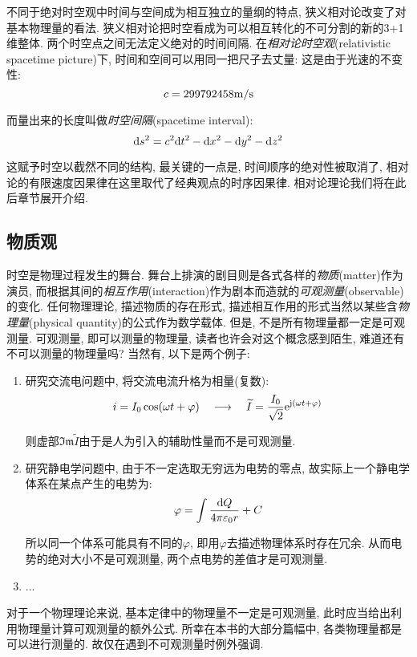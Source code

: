 不同于绝对时空观中时间与空间成为相互独立的量纲的特点, 狭义相对论改变了对基本物理量的看法. 狭义相对论把时空看成为可以相互转化的不可分割的新的3+1维整体. 两个时空点之间无法定义绝对的时间间隔. 在\emph{相对论时空观}(relativistic spacetime picture)下, 时间和空间可以用同一把尺子去丈量: 这是由于光速的不变性:
\[c=299792458{\rm m/s}\]

而量出来的长度叫做\emph{时空间隔}(spacetime interval):
\[\textrm{d} s^2=c^2\textrm{d} t^2-\textrm{d} x^2-\textrm{d} y^2-\textrm{d} z^2\]

这赋予时空以截然不同的结构, 最关键的一点是, 时间顺序的绝对性被取消了, 相对论的有限速度因果律在这里取代了经典观点的时序因果律. 相对论理论我们将在此后章节展开介绍.

\subsection{物质观}\label{2-1-2}

时空是物理过程发生的舞台. 舞台上排演的剧目则是各式各样的\emph{物质}(matter)作为演员, 而根据其间的\emph{相互作用}(interaction)作为剧本而造就的\emph{可观测量}(observable)的变化. 任何物理理论, 描述物质的存在形式, 描述相互作用的形式当然以某些含\emph{物理量}(physical quantity)的公式作为数学载体. 但是, 不是所有物理量都一定是可观测量. 可观测量, 即可以测量的物理量, 读者也许会对这个概念感到陌生, 难道还有不可以测量的物理量吗? 当然有, 以下是两个例子:
\begin{enumerate}
	\item 研究交流电问题中, 将交流电流升格为相量(复数):
	\[i=I_0\cos(\omega t+\varphi) \quad \longrightarrow \quad \widetilde{I}=\frac{I_0}{\sqrt{2}}{\rm e}^{{\rm j} \left(\omega t+\varphi\right)}\]

	则虚部$\mathfrak{Im}\widetilde{I}$由于是人为引入的辅助性量而不是可观测量.

	\item 研究静电学问题中, 由于不一定选取无穷远为电势的零点, 故实际上一个静电学体系在某点产生的电势为:
	\[\varphi=\int\frac{\textrm{d} Q}{4\pi\varepsilon_0 r}+C\]

	所以同一个体系可能具有不同的$\varphi$, 即用$\varphi$去描述物理体系时存在冗余. 从而电势的绝对大小不是可观测量, 两个点电势的差值才是可观测量.

	\item ...

\end{enumerate}

对于一个物理理论来说, 基本定律中的物理量不一定是可观测量, 此时应当给出利用物理量计算可观测量的额外公式. 所幸在本书的大部分篇幅中, 各类物理量都是可以进行测量的. 故仅在遇到不可观测量时例外强调.

